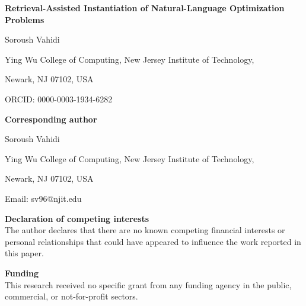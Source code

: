 \documentclass[preprint,12pt]{elsarticle}
\begin{document}
\begin{titlepage}
\thispagestyle{empty}

\begin{center}

\vspace*{1cm}

{\LARGE\bfseries Retrieval-Assisted Instantiation of Natural-Language Optimization Problems\par}

\vspace{1.5cm}

{\large Soroush Vahidi\par}

\vspace{0.4cm}

{\normalsize
Ying Wu College of Computing, New Jersey Institute of Technology,\par
Newark, NJ 07102, USA\par
}

\vspace{0.3cm}

{\normalsize ORCID: 0000-0003-1934-6282\par}

\vspace{0.8cm}

{\normalsize\bfseries Corresponding author\par}
{\normalsize Soroush Vahidi\par}
{\normalsize
Ying Wu College of Computing, New Jersey Institute of Technology,\par
Newark, NJ 07102, USA\par
}
{\normalsize Email: sv96@njit.edu\par}

\end{center}

\vspace{1.0cm}

\noindent\textbf{Declaration of competing interests}\\
The author declares that there are no known competing financial interests or personal relationships that could have appeared to influence the work reported in this paper.

\vspace{0.6cm}

\noindent\textbf{Funding}\\
This research received no specific grant from any funding agency in the public, commercial, or not-for-profit sectors.


\end{titlepage}
\end{document}
